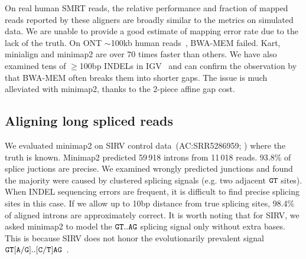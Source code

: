 \documentclass{bioinfo}
\begin{document}
On real human SMRT reads, the relative performance and fraction of mapped reads reported by
these aligners are broadly similar to the metrics on simulated data. We are
unable to provide a good estimate of mapping error rate due to the lack of the
truth.  On ONT $\sim$100kb human reads~\citep{Jain128835}, BWA-MEM failed.
Kart, minialign and minimap2 are over 70 times faster than others. We have also
examined tens of $\ge$100bp INDELs in IGV~\citep{Robinson:2011aa} and can
confirm the observation by~\citet{Sedlazeck169557} that BWA-MEM often breaks
them into shorter gaps. The issue is much alleviated with minimap2, thanks
to the 2-piece affine gap cost.

\subsection{Aligning long spliced reads}

We evaluated minimap2 on SIRV control data~(AC:SRR5286959;
\citealp{Byrne:2017aa}) where the truth is known. Minimap2 predicted 59\,918
introns from 11\,018 reads. 93.8\% of splice juctions are precise. We examined
wrongly predicted junctions and found the majority were caused by clustered
splicing signals (e.g. two adjacent ${\tt GT}$ sites). When INDEL sequencing
errors are frequent, it is difficult to find precise splicing sites in this
case. If we allow up to 10bp distance from true splicing sites, 98.4\% of
aligned introns are approximately correct. It is worth noting that for SIRV, we
asked minimap2 to model the ${\tt GT..AG}$ splicing signal only without extra
bases. This is because SIRV does not honor the evolutionarily prevalent signal
${\tt GT[A/G]..[C/T]AG}$~\citep{Irimia:2008aa}.
\end{document}
